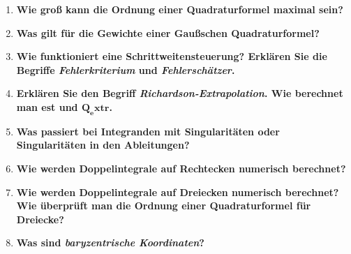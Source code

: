 \documentclass[10pt,a4paper]{article}
\begin{document}
\begin{enumerate}
		\item \textbf{Wie groß kann die Ordnung einer Quadraturformel maximal sein?} \\
		
		\item \textbf{Was gilt für die Gewichte einer Gaußschen Quadraturformel?} \\
		
		\item \textbf{Wie funktioniert eine Schrittweitensteuerung? Erklären Sie die Begriffe \textit{Fehlerkriterium} und \textit{Fehlerschätzer}.} \\
		
		\item \textbf{Erklären Sie den Begriff \textit{Richardson-Extrapolation}. Wie berechnet man est und $\pmb{Q_extr}$.} \\
		
		\item \textbf{Was passiert bei Integranden mit Singularitäten oder Singularitäten in den Ableitungen?} \\
		
		\item \textbf{Wie werden Doppelintegrale auf Rechtecken numerisch berechnet?} \\
		
		\item \textbf{Wie werden Doppelintegrale auf Dreiecken numerisch berechnet? Wie überprüft man die Ordnung einer Quadraturformel für Dreiecke?} \\
		
		\item \textbf{Was sind \textit{baryzentrische Koordinaten}?} \\
		
	\end{enumerate}
\end{document}

